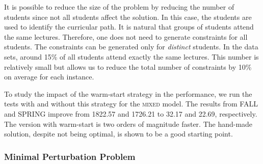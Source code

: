 \documentclass[twocolumn,natbib]{svjour3}          %
\newcounter{constraint}
\begin{document}
It is possible to reduce the size of the problem by reducing the number of students since not all students affect the solution. In this case, the students are used to identify the curricular path. It is natural that groups of students attend the same lectures. Therefore, one does not need to generate constraints for all students. The constraints can be generated only for \textit{distinct} students. In the data sets, around 15\% of all students attend exactly the same lectures. This number is relatively small but allows us to reduce the total number of constraints by 10\% on average for each instance. 

To study the impact of the warm-start strategy in the performance, we run the tests with and without this strategy for the \textsc{mixed} model. The results from \textsc{\textsc{FALL}} and \textsc{\textsc{SPRING}} improve from 1822.57 and 1726.21 to 32.17 and 22.69, respectively.  The version with warm-start is two orders of magnitude faster. The hand-made solution, despite not being optimal, is shown to be a good starting point. 



\subsubsection{Minimal Perturbation Problem}
\end{document}
